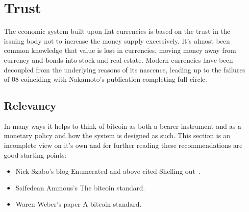 \section{Trust}

The economic system built upon fiat currencies is based on the trust in the issuing body not to increase the money supply excessively. It's almost been common knowledge that value is lost in currencies, moving money away from currency and bonds into stock and real estate. Modern currencies have been decoupled from the underlying reasons of its nascence, leading up to the failures of 08 coinciding with Nakamoto's publication completing full circle.

\newpage
\noindent
\vspace{6cm}

\subsection{Relevancy}
In many ways it helps to think of bitcoin as both a bearer instrument and as a monetary policy and how the system is designed as such. This section is an incomplete view on it's own and for further reading these recommendations are good starting points: 

\begin{itemize}
	\item Nick Szabo's blog Enumerated and above cited Shelling out~\cite{szabo:shelling:out, szabo:unenumerated}.
	\item Saifedean Ammous's The bitcoin standard.~\cite{ammous:bitcoin:standard}
	\item Waren Weber's paper A bitcoin standard.~\cite{weber:bitcoin:standard}
\end{itemize}